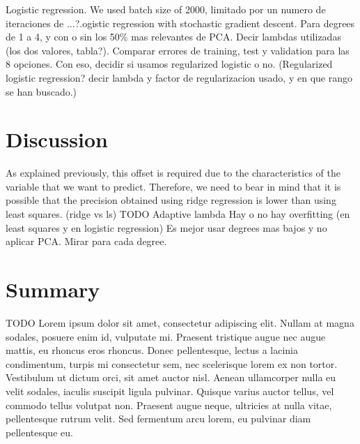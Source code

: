 \documentclass[10pt,conference,compsocconf]{IEEEtran}
\begin{document}
Logistic regression. We used batch size of 2000, limitado por un numero de iteraciones de ...?.ogistic regression with stochastic gradient descent.
Para degrees de 1 a 4, y con o sin los 50\% mas relevantes de PCA. Decir lambdas utilizadas (los dos valores, tabla?). Comparar errores de training, test y validation para las 8 opciones. Con eso, decidir si usamos regularized logistic o no.
(Regularized logistic regression? decir lambda y factor de regularizacion usado, y en que rango se han buscado.)

\section{Discussion}
\label{sec:discussion}
 As explained previously, this offset is required due to the characteristics of the variable that we want to predict.  Therefore, we need to bear in mind that it is possible that the precision obtained using ridge regression is lower than using least squares. (ridge vs ls)
TODO Adaptive lambda
Hay o no hay overfitting (en least squares y en logistic regression)
Es mejor usar degrees mas bajos y no aplicar PCA. Mirar para cada degree.

\section{Summary}
\label{sec:tips-writing}

TODO Lorem ipsum dolor sit amet, consectetur adipiscing elit. Nullam at magna sodales, posuere enim id, vulputate mi. Praesent tristique augue nec augue mattis, eu rhoncus eros rhoncus. Donec pellentesque, lectus a lacinia condimentum, turpis mi consectetur sem, nec scelerisque lorem ex non tortor. Vestibulum ut dictum orci, sit amet auctor nisl. Aenean ullamcorper nulla eu velit sodales, iaculis suscipit ligula pulvinar. Quisque vari\cite{kallet04methods}us auctor tellus, vel commodo tellus volutpat non. Praesent augue neque, ultricies at nulla vitae, pellentesque rutrum velit. Sed fermentum arcu lorem, eu pulvinar diam pellentesque eu.



\end{document}

